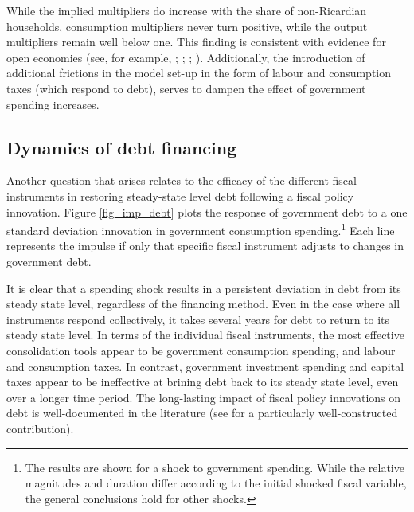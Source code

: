 \documentclass[a4paper,11pt]{article}
\numberwithin{equation}{section}
\begin{document}
	While the implied multipliers do increase with the share of non-Ricardian households, consumption multipliers never turn positive, while the output multipliers remain well below one. This finding is consistent with evidence for open economies (see, for example, \citealp{ratto2006}; \citealp{forni2009}; \citealp{naitram}; \citealp{sin2016}). Additionally, the introduction of additional frictions in the model set-up in the form of labour and consumption taxes (which respond to debt), serves to dampen the effect of government spending increases.
	
	\subsection{Dynamics of debt financing}
	
	Another question that arises relates to the efficacy of the different fiscal instruments in restoring steady-state level debt following a fiscal policy innovation. Figure \ref{fig_imp_debt} plots the response of government debt to a one standard deviation innovation in government consumption spending.\footnote{The results are shown for a shock to government spending. While the relative magnitudes and duration differ according to the initial shocked fiscal variable, the general conclusions hold for other shocks.} Each line represents the impulse if only that specific fiscal instrument adjusts to changes in government debt.
	
	It is clear that a spending shock results in a persistent deviation in debt from its steady state level, regardless of the financing method. Even in the case where all instruments respond collectively, it takes several years for debt to return to its steady state level. In terms of the individual fiscal instruments, the most effective consolidation tools appear to be government consumption spending, and labour and consumption taxes. In contrast, government investment spending and capital taxes appear to be ineffective at brining debt back to its steady state level, even over a longer time period. The long-lasting impact of fiscal policy innovations on debt is well-documented in the literature (see \citealp{leeper2010} for a particularly well-constructed contribution). 
	
\end{document}
